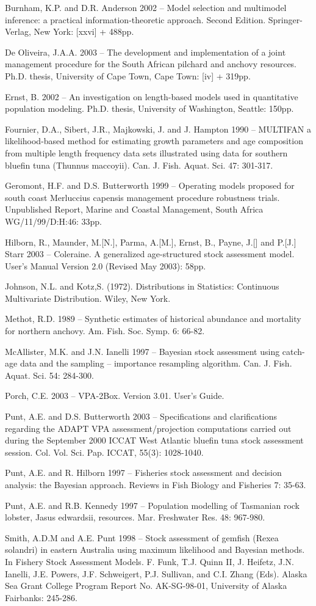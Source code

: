 \documentclass[a4paper,10pt]{article}
\begin{document}
Burnham, K.P. and D.R. Anderson 2002 – Model selection and multimodel inference: a practical information-theoretic approach. Second Edition. Springer-Verlag, New York: [xxvi] + 488pp.

De Oliveira, J.A.A. 2003 – The development and implementation of a joint management procedure for the South African pilchard and anchovy resources. Ph.D. thesis, University of Cape Town, Cape Town: [iv] + 319pp.

Ernst, B. 2002 – An investigation on length-based models used in quantitative population modeling. Ph.D. thesis, University of Washington, Seattle: 150pp.

Fournier, D.A., Sibert, J.R., Majkowski, J. and J. Hampton 1990 – MULTIFAN a likelihood-based method for estimating growth parameters and age composition from multiple length frequency data sets illustrated using data for southern bluefin tuna (Thunnus maccoyii). Can. J. Fish. Aquat. Sci. 47: 301-317.

Geromont, H.F. and D.S. Butterworth 1999 – Operating models proposed for south coast Merluccius capensis management procedure robustness trials. Unpublished Report, Marine and Coastal Management, South Africa WG/11/99/D:H:46: 33pp.

Hilborn, R., Maunder, M.[N.], Parma, A.[M.], Ernst, B., Payne, J.[] and P.[J.] Starr 2003 – Coleraine. A generalized age-structured stock assessment model. User’s Manual Version 2.0 (Revised May 2003): 58pp.

Johnson, N.L. and Kotz,S. (1972). Distributions in Statistics: Continuous Multivariate Distribution. Wiley, New York.

Methot, R.D. 1989 – Synthetic estimates of historical abundance and mortality for northern anchovy. Am. Fish. Soc. Symp. 6: 66-82.

McAllister, M.K. and J.N. Ianelli 1997 – Bayesian stock assessment using catch-age data and the sampling – importance resampling algorithm. Can. J. Fish. Aquat. Sci. 54: 284-300.

Porch, C.E. 2003 – VPA-2Box. Version 3.01. User’s Guide.

Punt, A.E. and D.S. Butterworth 2003 – Specifications and clarifications regarding the ADAPT VPA assessment/projection computations carried out during the September 2000 ICCAT West Atlantic bluefin tuna stock assessment session. Col. Vol. Sci. Pap. ICCAT, 55(3): 1028-1040.

Punt, A.E. and R. Hilborn 1997 – Fisheries stock assessment and decision analysis: the Bayesian approach. Reviews in Fish Biology and Fisheries 7: 35-63.

Punt, A.E. and R.B. Kennedy 1997 – Population modelling of Tasmanian rock lobster, Jasus edwardsii, resources. Mar. Freshwater Res. 48: 967-980.

Smith, A.D.M and A.E. Punt 1998 – Stock assessment of gemfish (Rexea solandri) in eastern Australia using maximum likelihood and Bayesian methods. In Fishery Stock Assessment Models. F. Funk, T.J. Quinn II, J. Heifetz, J.N. Ianelli, J.E. Powers, J.F. Schweigert, P.J. Sullivan, and C.I. Zhang (Eds). Alaska Sea Grant College Program Report No. AK-SG-98-01, University of Alaska Fairbanks: 245-286.
\end{document}
